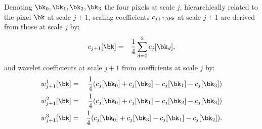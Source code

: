 


Denoting $\bk_0,\bk_1,\bk_2,\bk_3$  the four pixels at scale $j$, hierarchically related to 
the pixel $\bk$ at scale $j+1$,  scaling coefficients  $c_{j+1,\bk}$ at scale $j+1$ are derived from 
  those at scale $j$ by:
\begin{eqnarray}
\label{def_haar1}
c_{j+1}[\bk] &=& \frac{1}{4} \sum_{d=0}^3 c_{j} [\bk_d],
\end{eqnarray}
and wavelet coefficients at scale $j+1$ from coefficients at scale  $j$ by:
\begin{eqnarray}
\label{def_haar2}
w^{1}_{j+1} [\bk] &=& \frac{1}{4} (c_{j}[\bk_0]+c_{j} [\bk_2]   -  c_{j} [\bk_1]-c_{j}[\bk_3])  \nonumber  \\
w^{2}_{j+1} [\bk] &=&\frac{1}{4}  (c_{j}[\bk_0]+c_{j} [\bk_1]   -  c_{j}[\bk_2]-c_{j}[\bk_3])  \nonumber  \\
w^{3}_{j+1} [\bk] &=&\frac{1}{4}  (c_{j}[\bk_0]+c_{j} [\bk_3]   -  c_{j} [\bk_1]-c_{j}[\bk_2]) .
\end{eqnarray}

